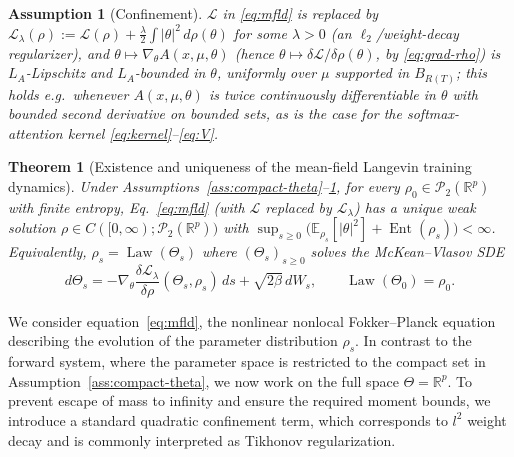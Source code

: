 \documentclass[11pt,a4wide]{article}
\newtheorem{theorem}{Theorem}[section]
\newtheorem{assumption}{Assumption}
\theoremstyle{definition}
\newcommand{\R}{\mathbb{R}}
\newcommand{\Prob}{\mathcal{P}}
\DeclareMathOperator{\Ent}{Ent}
\DeclareMathOperator{\Law}{Law}
\begin{document}
\begin{assumption}[Confinement]
\label{ass:confine}
$\mathcal L$ in \eqref{eq:mfld} is replaced by $\mathcal L_\lambda(\rho):=\mathcal L(\rho) + \tfrac\lambda2\int|\theta|^2\,d\rho(\theta)$ for some $\lambda>0$ (an $\ell_2$/weight-decay regularizer), and $\theta\mapsto \nabla_\theta A(x,\mu,\theta)$ (hence $\theta\mapsto\delta\mathcal L/\delta\rho(\theta)$, by \eqref{eq:grad-rho}) is $L_A$-Lipschitz and $L_A$-bounded in $\theta$, uniformly over $\mu$ supported in $B_{R(T)}$; this holds e.g.\ whenever $A(x,\mu,\theta)$ is twice continuously differentiable in $\theta$ with bounded second derivative on bounded sets, as is the case for the softmax-attention kernel \eqref{eq:kernel}--\eqref{eq:V}.
\end{assumption}

\begin{theorem}[Existence and uniqueness of the mean-field Langevin training dynamics]
\label{thm:mfld-wp}
Under Assumptions~\ref{ass:compact-theta}--\ref{ass:confine}, for every $\rho_0\in\Prob_2(\R^p)$ with finite entropy, Eq.~\eqref{eq:mfld} (with $\mathcal L$ replaced by $\mathcal L_\lambda$) has a unique weak solution $\rho\in C([0,\infty);\Prob_2(\R^p))$ with $\sup_{s\ge0}\big(\mathbb E_{\rho_s}[|\theta|^2] + \Ent(\rho_s)\big)<\infty$. Equivalently, $\rho_s=\Law(\Theta_s)$ where $(\Theta_s)_{s\ge0}$ solves the McKean--Vlasov SDE
\begin{equation}
d\Theta_s = -\nabla_\theta\frac{\delta\mathcal L_\lambda}{\delta\rho}(\Theta_s,\rho_s)\,ds + \sqrt{2\beta}\,dW_s, \qquad \Law(\Theta_0)=\rho_0.
\label{eq:mfld-sde}
\end{equation}
\end{theorem}
\fi 

We  consider equation~\eqref{eq:mfld}, the nonlinear nonlocal Fokker--Planck
equation describing the evolution of the parameter distribution $\rho_s$.
In contrast to the forward system, where the parameter space is
restricted to the compact set in Assumption~\ref{ass:compact-theta}, we now
work on the full space $\Theta=\mathbb R^p$. To prevent escape of mass to
infinity and ensure the required moment bounds, we introduce a standard
quadratic confinement term,  which corresponds to $l^2$ weight decay and is commonly interpreted as Tikhonov regularization.
\end{document}
